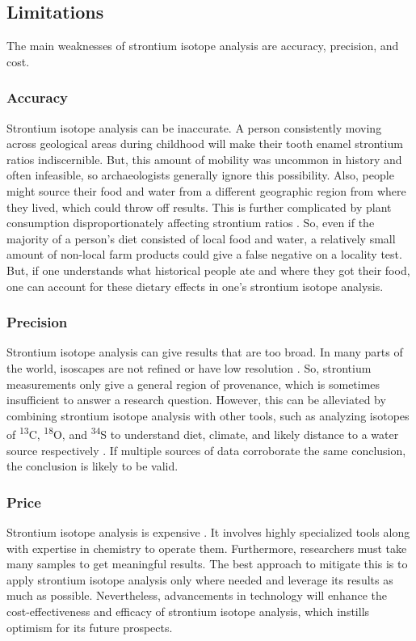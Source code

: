 \documentclass[a4paper, 12pt]{article}
\begin{document}
\subsection{Limitations}
The main weaknesses of strontium isotope analysis are accuracy, precision, and cost.
\subsubsection{Accuracy}
Strontium isotope analysis can be inaccurate. A person consistently moving
across geological areas during childhood will make their tooth enamel strontium ratios
indiscernible.
But, this amount of mobility was uncommon in history and often infeasible, so archaeologists
generally ignore this possibility.
Also, people might source their food and water from a different geographic region from where
they lived, which could throw off results.
This is further complicated by plant consumption disproportionately affecting strontium ratios \citep{price2006}.
So, even if the majority of a
person's diet consisted of local food and water, a relatively
small amount of non-local farm products could give a false negative on a locality test.
But, if one understands what historical people ate and where they got their food,
one can account for these dietary effects in one's strontium isotope analysis.



\subsubsection{Precision}
Strontium isotope analysis can give results that are too broad. In many parts of the world, isoscapes are not
refined or have low resolution \citep{holt2021}.
So, strontium measurements only give a general region of provenance, which is sometimes insufficient to answer a research question.
However, this can be alleviated by combining strontium isotope analysis with other tools,
such as analyzing isotopes of \textsuperscript{13}C, \textsuperscript{18}O, and \textsuperscript{34}S
to understand diet, climate, and likely distance to a water source respectively \citep{madgwick2019}.
If multiple sources of data corroborate the same conclusion,
the conclusion is likely to be valid.

\subsubsection{Price}
Strontium isotope analysis is expensive \citep{holt2021}. It involves highly specialized tools along
with expertise in chemistry to operate them. Furthermore, researchers must take many samples to get
meaningful results. The best approach to mitigate this
is to apply strontium isotope analysis only where needed and leverage its results
as much as possible. Nevertheless, advancements in technology will
enhance the cost-effectiveness and efficacy of strontium isotope analysis,
which instills optimism for its future prospects.
\end{document}
